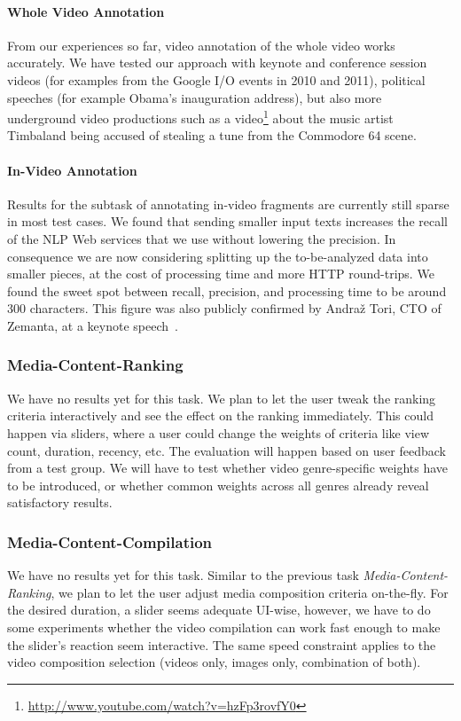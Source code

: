 \documentclass[runningheads,a4paper]{llncs}
\begin{document}
\paragraph{Whole Video Annotation}
From our experiences so far, video annotation of the whole video works accurately. We have tested our approach with keynote and conference session videos (for examples from the Google I/O events in 2010 and 2011), political speeches (for example Obama's inauguration address), but also more underground video productions such as a video\footnote{\url{http://www.youtube.com/watch?v=hzFp3rovfY0}} about the music artist Timbaland being accused of stealing a tune from the Commodore 64 scene.

\paragraph{In-Video Annotation}
Results for the subtask of annotating in-video fragments are currently still sparse in most test cases. We found that sending smaller input texts increases the recall of the NLP Web services that we use without lowering the precision. In consequence we are now considering splitting up the to-be-analyzed data into smaller pieces, at the cost of processing time and more HTTP round-trips. We found the sweet spot between recall, precision, and processing time to be around 300 characters. This figure was also publicly confirmed by Andra\v{z} Tori, CTO of Zemanta, at a keynote speech~\cite{andraz}.

\subsubsection{Media-Content-Ranking}
We have no results yet for this task. We plan to let the user tweak the ranking criteria interactively and see the effect on the ranking immediately. This could happen via sliders, where a user could change the weights of criteria like view count, duration, recency, etc. The evaluation will happen based on user feedback from a test group. We will have to test whether video genre-specific weights have to be introduced, or whether common weights across all genres already reveal satisfactory results.

\subsubsection{Media-Content-Compilation}
We have no results yet for this task. Similar to the previous task \emph{Media-Content-Ranking}, we plan to let the user adjust media composition criteria on-the-fly. For the desired duration, a slider seems adequate UI-wise, however, we have to do some experiments whether the video compilation can work fast enough to make the slider's reaction seem interactive. The same speed constraint applies to the video composition selection (videos only, images only, combination of both).
\end{document}
